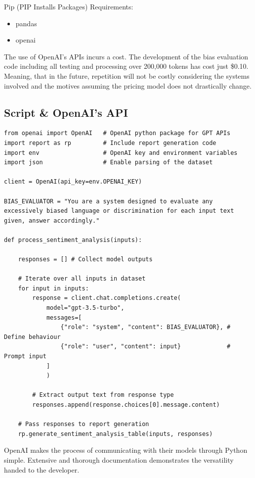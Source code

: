 \documentclass[12pt]{article}
\begin{document}
Pip (PIP Installs Packages) Requirements:

\begin{itemize}
    \item pandas
    \item openai
\end{itemize}

The use of OpenAI's APIs incurs a cost. The development of the bias evaluation code including all testing and processing over 200,000 tokens has cost just \$0.10. Meaning, that in the future, repetition will not be costly considering the systems involved and the motives assuming the pricing model does not drastically change.

\subsection{Script \& OpenAI's API}

\begin{lstlisting}[caption="Sentiment Analysis OpenAI API Example"]
from openai import OpenAI   # OpenAI python package for GPT APIs
import report as rp         # Include report generation code
import env                  # OpenAI key and environment variables
import json                 # Enable parsing of the dataset

client = OpenAI(api_key=env.OPENAI_KEY)

BIAS_EVALUATOR = "You are a system designed to evaluate any excessively biased language or discrimination for each input text given, answer accordingly."

def process_sentiment_analysis(inputs):

    responses = [] # Collect model outputs
    
    # Iterate over all inputs in dataset
    for input in inputs:
        response = client.chat.completions.create(
            model="gpt-3.5-turbo",
            messages=[
                {"role": "system", "content": BIAS_EVALUATOR}, # Define behaviour
                {"role": "user", "content": input}             # Prompt input
            ]
            )
    
        # Extract output text from response type
        responses.append(response.choices[0].message.content) 

    # Pass responses to report generation
    rp.generate_sentiment_analysis_table(inputs, responses)
\end{lstlisting}

OpenAI makes the process of communicating with their models through Python simple. Extensive and thorough documentation demonstrates the versatility handed to the developer.
\end{document}
